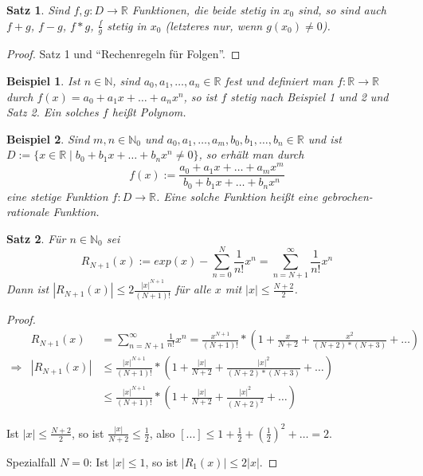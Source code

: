 \documentclass[a4paper,10pt]{article}
\newtheorem{example}{Beispiel}
\newtheorem{satz}{Satz}
\begin{document}
\begin{satz}
 Sind $f, g: D \rightarrow \mathbb{R}$ Funktionen, die beide stetig in $x_0$ sind, so sind auch $f + g$, $f - g$, $f * g$, $\frac{f}{g}$ stetig in $x_0$ (letzteres nur, wenn $g(x_0) \ne 0$).
\end{satz}

\begin{proof}
 Satz 1 und ``Rechenregeln für Folgen''.
\end{proof}

\begin{example}
 Ist $n \in \mathbb{N}$, sind $a_0, a_1, \dots, a_n \in \mathbb{R}$ fest und definiert man $f: \mathbb{R} \rightarrow \mathbb{R}$ durch $f(x) = a_0 + a_1x + \dots + a_nx^n$, so ist $f$ stetig nach Beispiel 1 und 2 und Satz 2.
 Ein solches $f$ heißt Polynom.
\end{example}

\begin{example}
 Sind $m, n \in \mathbb{N}_0$ und $a_0, a_1, \dots, a_m, b_0, b_1, \dots, b_n \in \mathbb{R}$ und ist $D := \{x \in \mathbb{R} \mid b_0 + b_1x + \dots + b_nx^n \ne 0\}$, so erhält man durch
 \begin{equation}
  f(x) := \frac{a_0 + a_1x + \dots + a_mx^m}{b_0 + b_1x + \dots + b_nx^n}
 \end{equation}
 eine stetige Funktion $f: D \rightarrow \mathbb{R}$.
 Eine solche Funktion heißt eine gebrochen-rationale Funktion.
\end{example}

\begin{satz}
 Für $n \in \mathbb{N}_0$ sei
 \begin{equation}
  R_{N + 1}(x) := exp(x) - \sum_{n = 0}^N \frac{1}{n!} x^n = \sum_{n = N + 1}^\infty \frac{1}{n!} x^n
 \end{equation}
 Dann ist $|R_{N + 1}(x)| \le 2 \frac{|x|^{N + 1}}{(N + 1)!}$ für alle $x$ mit $|x| \le \frac{N + 2}{2}$.
\end{satz}

\begin{proof}
 \begin{align}
  & R_{N + 1}(x) & = \sum_{n = N + 1}^\infty \frac{1}{n!} x^n = \frac{x^{N + 1}}{(N + 1)!} * (1 + \frac{x}{N + 2} + \frac{x^2}{(N + 2) * (N + 3)} + \dots)\\
  \Rightarrow & |R_{N + 1}(x)| & \le \frac{|x|^{N + 1}}{(N + 1)!} * (1 + \frac{|x|}{N + 2} + \frac{|x|^2}{(N + 2) * (N + 3)} + \dots)\\
  & & \le \frac{|x|^{N + 1}}{(N + 1)!} * (1 + \frac{|x|}{N + 2} + \frac{|x|^2}{(N + 2)^2} + \dots)
 \end{align}

 Ist $|x| \le \frac{N + 2}{2}$, so ist $\frac{|x|}{N + 2} \le \frac{1}{2}$, also $[...] \le 1 + \frac{1}{2} + (\frac{1}{2})^2 + \dots = 2$.
 
 Spezialfall $N = 0$: Ist $|x| \le 1$, so ist $|R_1(x)| \le 2 |x|$.
\end{proof}
\end{document}
